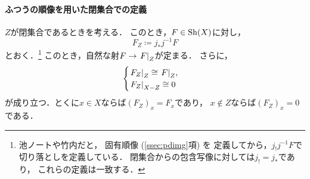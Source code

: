 \paragraph{ふつうの順像を用いた閉集合での定義}
\(Z\)が閉集合であるときを考える．
このとき，\(F\in\Sh(X)\)に対し，
\[
    F_Z\coloneqq j_{\ast}j^{-1}F
\]
とおく．\footnote{\label{CMT:supp-cut}
    池ノート\cite{Ike21}や竹内\cite{Tak17}だと，
    固有順像 (\ref{ssec:pdimg}項) を
    定義してから，\(j_{!}j^{-1}F\)で切り落としを定義している．
    閉集合からの包含写像に対しては\(j_!=j_\ast\)であり，
    これらの定義は一致する．
}
このとき，自然な射\(F\to \mres[F]{Z}\)が定まる．
さらに，
\begin{equation}\label{eq2313}
    \begin{cases}
        \mres[F_{Z}]{Z}\cong \mres[F]{Z},\\
        \mres[F_{Z}]{X-Z}\cong 0
    \end{cases}%
\end{equation}
が成り立つ．とくに\(x\in X\)ならば\((F_Z)_x=F_x\)であり，
\(x\notin Z\)ならば\((F_Z)_x=0\)である．
